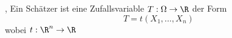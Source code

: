 \sep
\Def[1.1] \newline
Ein Schätzer ist eine Zufallsvariable \(T : \Omega \rightarrow \R \) der Form \[ T = t(X_1, \dots , X_n)\] wobei \(t : \R^n \rightarrow \R\)
 